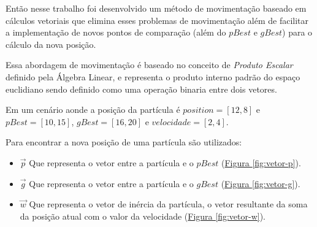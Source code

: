             
            Então nesse trabalho foi desenvolvido um método de movimentação baseado em cálculos vetoriais que elimina esses problemas de movimentação além de facilitar a implementação de novos pontos de comparação (além do $pBest$ e $gBest$) para o cálculo da nova posição.\newline
            
                Essa abordagem de movimentação é baseado no conceito de \textit{Produto Escalar} definido pela Álgebra Linear, e representa o produto interno padrão do espaço euclidiano sendo definido como uma operação binaria entre dois vetores.\newline
                
                \noindent Em um cenário aonde a posição da partícula é $position=[12,8]$ e $pBest=[10, 15]$, $gBest=[16,20]$ e $velocidade=[2,4]$.

                \noindent Para encontrar a nova posição de uma partícula são utilizados:
                \begin{itemize}
                    \item $\vec p$ Que representa o vetor entre a partícula e o $pBest$ 
                        (\hyperref[fig:vetor-p]{Figura \ref{fig:vetor-p}}).
                    \item $\vec g$ Que representa o vetor entre a partícula e o $gBest$ 
                        (\hyperref[fig:vetor-g]{Figura \ref{fig:vetor-g}}).
                    \item $\vec w$ Que representa o vetor de inércia da partícula, o vetor resultante da soma da posição atual com o valor da velocidade 
                        (\hyperref[fig:vetor-w]{Figura \ref{fig:vetor-w}}).
                \end{itemize}

